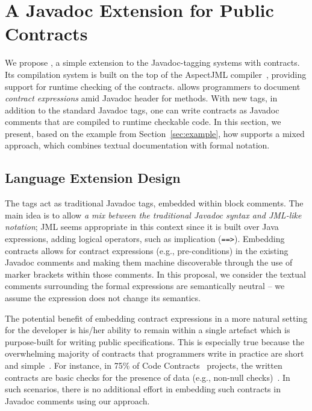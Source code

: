 \section{A Javadoc Extension for Public Contracts}
\label{sec:approach}

We propose \contractjdoc{}, a simple extension to the Javadoc-tagging systems with contracts. Its compilation system is built on the top of the AspectJML compiler~\cite{aspectjml}, providing support for runtime checking of the contracts.
\contractjdoc{} allows programmers to document \emph{contract expressions} amid Javadoc header for methods. With new tags, in addition to the standard Javadoc tags, one can write contracts as Javadoc comments that are compiled to runtime checkable code. 
In this section, we present, based on the example from Section~\ref{sec:example}, how \contractjdoc{} supports a mixed approach, which combines textual documentation with formal notation.

\subsection{Language Extension Design}

The \contractjdoc{} tags act as traditional Javadoc tags, embedded within block comments. 
The main idea is to allow \emph{a mix between the traditional Javadoc syntax and JML-like notation}; 
JML seems appropriate in this context since it is built over Java expressions, adding logical operators, such as implication (\texttt{==>}).
Embedding contracts allows for contract expressions (e.g., pre-conditions) in the existing Javadoc comments
and making them machine discoverable through the use of
marker brackets within those comments.
In this proposal, we consider the textual comments surrounding the formal expressions are semantically neutral -- we assume the expression does not change its semantics. 

The potential benefit of embedding contract expressions in a more natural setting for the developer is his/her ability to remain within a single artefact which is purpose-built for writing public specifications. 
This is especially true because the overwhelming majority of contracts that programmers write in
practice are short and simple~\cite{Estler-etal14,typeContracts}. For instance, in 75\% of Code Contracts~\cite{codeContractsPaper} projects, the written contracts are basic checks for the presence of data (e.g., non-null checks)~\cite{typeContracts}. In such scenarios, there is no additional effort in embedding such contracts in Javadoc comments using our \contractjdoc{} approach.

